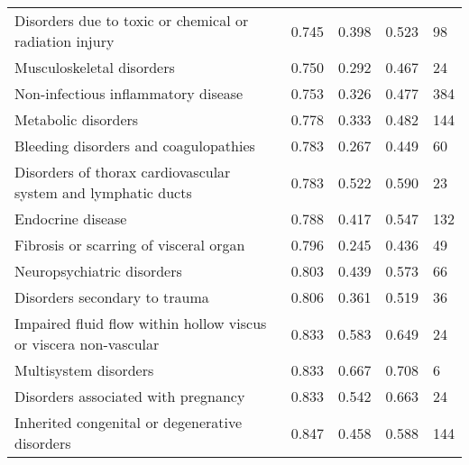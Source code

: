 \begin{table*}
\begin{tabular}{p{}p{}p{}p{}p{}}
        Disorders due to toxic or chemical or radiation injury & \cellcolor{blue!50}0.745 & \cellcolor{blue!31}0.398 & \cellcolor{blue!36}0.523 & \cellcolor{blue!27}98 \\
        Musculoskeletal disorders & \cellcolor{blue!50}0.750 & \cellcolor{blue!12}0.292 & \cellcolor{blue!30}0.467 & \cellcolor{blue!0}24 \\
        Non-infectious inflammatory disease & \cellcolor{blue!50}0.753 & \cellcolor{blue!21}0.326 & \cellcolor{blue!32}0.477 & \cellcolor{blue!22}384 \\
        Metabolic disorders & \cellcolor{blue!50}0.778 & \cellcolor{blue!21}0.333 & \cellcolor{blue!32}0.482 & \cellcolor{blue!38}144 \\
        Bleeding disorders and coagulopathies & \cellcolor{blue!50}0.783 & \cellcolor{blue!14}0.267 & \cellcolor{blue!28}0.449 & \cellcolor{blue!12}60 \\
        Disorders of thorax cardiovascular system and lymphatic ducts & \cellcolor{blue!50}0.783 & \cellcolor{blue!34}0.522 & \cellcolor{blue!30}0.590 & \cellcolor{blue!0}23 \\
        Endocrine disease & \cellcolor{blue!50}0.788 & \cellcolor{blue!30}0.417 & \cellcolor{blue!34}0.547 & \cellcolor{blue!35}132 \\
        Fibrosis or scarring of visceral organ & \cellcolor{blue!50}0.796 & \cellcolor{blue!8}0.245 & \cellcolor{blue!27}0.436 & \cellcolor{blue!8}49 \\
        Neuropsychiatric disorders & \cellcolor{blue!50}0.803 & \cellcolor{blue!35}0.439 & \cellcolor{blue!38}0.573 & \cellcolor{blue!10}66 \\
        Disorders secondary to trauma & \cellcolor{blue!50}0.806 & \cellcolor{blue!24}0.361 & \cellcolor{blue!35}0.519 & \cellcolor{blue!7}36 \\
        Impaired fluid flow within hollow viscus or viscera non-vascular & \cellcolor{blue!50}0.833 & \cellcolor{blue!43}0.583 & \cellcolor{blue!32}0.649 & \cellcolor{blue!0}24 \\
        Multisystem disorders & \cellcolor{blue!50}0.833 & \cellcolor{blue!50}0.667 & \cellcolor{blue!42}0.708 & \cellcolor{blue!0}6 \\
        Disorders associated with pregnancy & \cellcolor{blue!50}0.833 & \cellcolor{blue!34}0.542 & \cellcolor{blue!42}0.663 & \cellcolor{blue!0}24 \\
        Inherited congenital or degenerative disorders & \cellcolor{blue!50}0.847 & \cellcolor{blue!35}0.458 & \cellcolor{blue!30}0.588 & \cellcolor{blue!38}144 \\

\end{tabular}
\end{table*}
